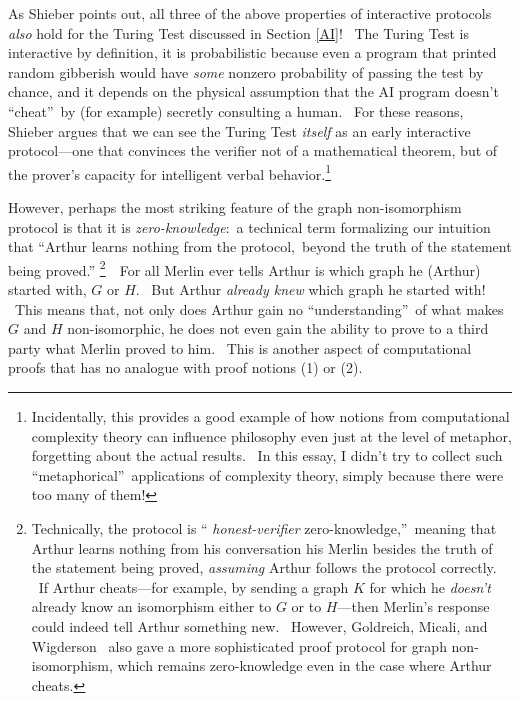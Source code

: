 \documentclass[12pt,onecolumn]{article}%
\begin{document}
As Shieber \cite{shieber} points out, all three of the above properties of
interactive protocols \textit{also} hold for the Turing Test discussed in
Section \ref{AI}! \ The Turing Test is interactive by definition, it is
probabilistic because even a program that printed random gibberish would have
\textit{some} nonzero probability of passing the test by chance, and it
depends on the physical assumption that the AI program doesn't
\textquotedblleft cheat\textquotedblright\ by (for example) secretly
consulting a human. \ For these reasons, Shieber argues that we can see the
Turing Test \textit{itself} as an early interactive protocol---one that
convinces the verifier not of a mathematical theorem, but of the prover's
capacity for intelligent verbal behavior.\footnote{Incidentally, this provides
a good example of how notions from computational complexity theory can
influence philosophy even just at the level of metaphor, forgetting about the
actual results. \ In this essay, I didn't try to collect such
\textquotedblleft metaphorical\textquotedblright\ applications of complexity
theory, simply because there were too many of them!}

However, perhaps the most striking feature of the graph non-isomorphism
protocol is that it is \textit{zero-knowledge}:\ a technical term formalizing
our intuition that \textquotedblleft Arthur learns nothing from the
protocol,\ beyond the truth of the statement being proved.\textquotedblright%
\footnote{Technically, the protocol is \textquotedblleft%
\textit{honest-verifier} zero-knowledge,\textquotedblright\ meaning that
Arthur learns nothing from his conversation his Merlin besides the truth of
the statement being proved, \textit{assuming} Arthur follows the protocol
correctly. \ If Arthur cheats---for example, by sending a graph $K$ for which
he \textit{doesn't} already know an isomorphism either to $G$ or to $H$---then
Merlin's response could indeed tell Arthur something new. \ However,
Goldreich, Micali, and Wigderson \cite{gmw}\ also gave a more sophisticated
proof protocol for graph non-isomorphism, which remains zero-knowledge even in
the case where Arthur cheats.}\ \ For all Merlin ever tells Arthur is which
graph he (Arthur) started with, $G$ or $H$. \ But Arthur \textit{already knew}
which graph he started with! \ This means that, not only does Arthur gain no
\textquotedblleft understanding\textquotedblright\ of what makes $G$ and $H$
non-isomorphic, he does not even gain the ability to prove to a third party
what Merlin proved to him. \ This is another aspect of computational proofs
that has no analogue with proof notions (1) or (2).
\end{document}
